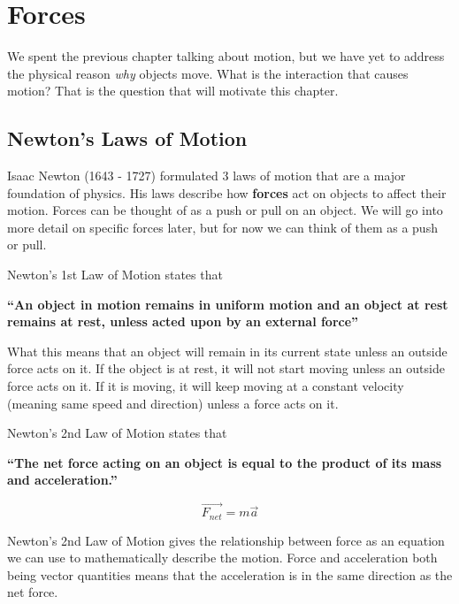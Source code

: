 \documentclass[12pt]{book}
\begin{document}
\chapter{Forces}
\setcounter{example}{1}
\addtocounter{chp}{1}

We spent the previous chapter talking about motion, but we have yet to address the physical reason \textit{why} objects move. What is the interaction that causes motion? That is the question that will motivate this chapter.

\section{Newton's Laws of Motion}

Isaac Newton (1643 - 1727) formulated 3 laws of motion that are a major foundation of physics. His laws describe how \textbf{forces} act on objects to affect their motion. Forces can be thought of as a push or pull on an object. We will go into more detail on specific forces later, but for now we can think of them as a push or pull.

\linespace

Newton's 1st Law of Motion states that

\hspace{10pt}

\textbf{``An object in motion remains in uniform motion and an object at rest remains at rest, unless acted upon by an external force''}

\linespace

What this means that an object will remain in its current state unless an outside force acts on it. If the object is at rest, it will not start moving unless an outside force acts on it. If it is moving, it will keep moving at a constant velocity (meaning same speed and direction) unless a force acts on it.

\linespace

Newton's 2nd Law of Motion states that

\hspace{10pt}

\textbf{``The net force acting on an object is equal to the product of its mass and acceleration.''}

\begin{equation}
\overrightarrow{F_{net}} = m \overrightarrow{a}
\label{2ndlaw}
\end{equation}

\linespace

Newton's 2nd Law of Motion gives the relationship between force as an equation we can use to mathematically describe the motion. Force and acceleration both being vector quantities means that the acceleration is in the same direction as the net force.
\end{document}
